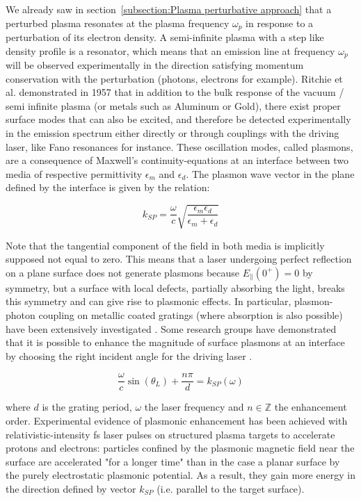 We already saw in section~\ref{subsection:Plasma perturbative approach} that a perturbed plasma resonates at the plasma frequency $\omega_p$ in response to a perturbation of its electron density. A semi-infinite plasma with a step like density profile is a resonator, which means that an emission line at frequency $\omega_p$ will be observed experimentally in the direction satisfying momentum conservation with the perturbation (photons, electrons for example). Ritchie et al. demonstrated in 1957 \cite{douglas1957excitation} that in addition to the bulk response of the vacuum / semi infinite plasma (or metals such as Aluminum or Gold), there exist proper surface modes that can also be excited, and therefore be detected experimentally in the emission spectrum either directly or through couplings with the driving laser, like Fano resonances for instance. These oscillation modes, called plasmons, are a consequence of Maxwell's continuity-equations at an interface between two media of respective permittivity $\epsilon_m$ and $\epsilon_d$. The plasmon wave vector in the plane defined by the interface is given by the relation:

\begin{equation}
k_{SP} = \frac{\omega}{c}\sqrt{\frac{\epsilon_m\epsilon_d}{\epsilon_m+\epsilon_d}}
\end{equation}

Note that the tangential component of the field in both media is implicitly supposed not equal to zero. This means that a laser undergoing perfect reflection on a plane surface does not generate plasmons because $E_{\parallel}(0^{+}) = 0$ by symmetry, but a surface with local defects, partially absorbing the light, breaks this symmetry and can give rise to plasmonic effects. In particular, plasmon-photon coupling on metallic coated gratings (where absorption is also possible) have been extensively investigated \cite{ritchie1968surface}.
Some research groups have demonstrated that it is possible to enhance the magnitude of surface plasmons at an interface by choosing the right incident angle for the driving laser \cite{fedeli2015electron}.

\begin{equation}
\frac{\omega}{c}\sin(\theta_L) + \frac{n\pi}{d} = k_{SP}(\omega)
\end{equation}

where $d$ is the grating period, $\omega$ the laser frequency and $n\in \mathbb{Z}$ the enhancement order. Experimental evidence of plasmonic enhancement has been achieved with relativistic-intensity fs laser pulses on structured plasma targets to accelerate protons \cite{ceccotti2013evidence} and electrons\cite{fedeli2015electron}: particles confined by the plasmonic magnetic field near the surface are accelerated "for a longer time" than in the case a planar surface by the purely electrostatic plasmonic potential. As a result, they gain more energy in the direction defined by vector $k_{SP}$ (i.e. parallel to the target surface).

